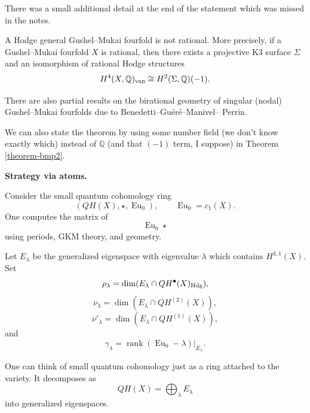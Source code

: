 \begin{remark}
\label{remark-k3-surface2}
There was a small additional detail at
the end of the statement which was
missed in the notes.
\end{remark}

\begin{theorem}
\label{theorem-bmp2}
A Hodge general Gushel--Mukai fourfold
is not rational.
More precisely, if a Gushel--Mukai
fourfold $X$ is rational, then there
exists a projective K3 surface
$\Sigma$ and an isomorphism of
rational Hodge structures
\[
        H^4(X,\mathbb{Q})_{\rm van}
        \cong
        H^2(\Sigma,\mathbb{Q})(-1).
\]
\end{theorem}

\begin{remark}
\label{remark-also-partial}
There are also partial results on the
birational geometry of singular
(nodal) Gushel--Mukai fourfolds due
to Benedetti--Gu\'er\'e--Manivel--
Perrin.
\end{remark}

\begin{remark}
\label{remark-number-field}
We can also state the theorem
by using some number field (we don't
know exactly which) instead of $\mathbb{Q}$
(and that $(-1)$ term, I suppose)
in Theorem \ref{theorem-bmp2}.
\end{remark}

\medskip\noindent
{\bf Strategy via atoms.}

Consider the small quantum cohomology
ring
\[
        (QH(X),\star,\operatorname{Eu}_0),
        \qquad
        \operatorname{Eu}_0=c_1(X).
\]
One computes the matrix of
\[
        \operatorname{Eu}_0\star
\]
using periods, GKM theory, and
geometry.

Let $E_\lambda$ be the generalized
eigenspace with eigenvalue $\lambda$
which contains $H^{3,1}(X)$.
Set
\[
        \rho_\lambda
        =
        \dim(E_\lambda\cap
        QH^\bullet(X)_{\rm Hdg}),
\]
\[
        \nu_\lambda
        =
        \dim(E_\lambda\cap
        QH^{(2)}(X)),
\]
\[
        \nu'_\lambda
        =
        \dim(E_\lambda\cap
        QH^{(1)}(X)),
\]
and
\[
        \gamma_\lambda
        =
        \operatorname{rank}
        \left.
        (\operatorname{Eu}_0-\lambda)
        \right|_{E_\lambda}.
\]

One can think of small quantum cohomology
just as a ring attached to the variety.
It decomposes as
\[
        QH(X)=\bigoplus_\lambda E_\lambda
\]
into generalized eigenspaces.


